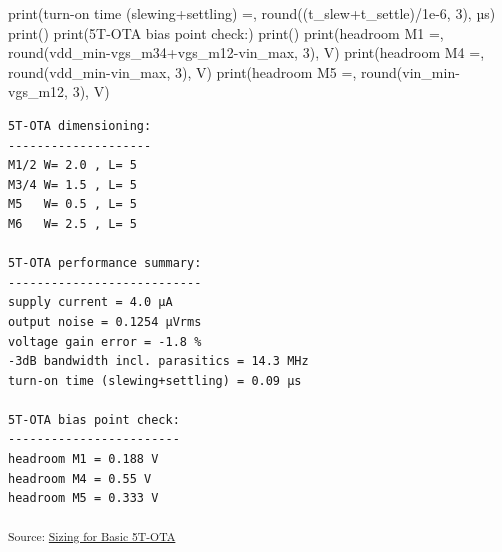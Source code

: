 \documentclass[
  a4paper,
  DIV=11,
  numbers=noendperiod]{scrartcl}
\newenvironment{Shaded}{\begin{snugshade}}{\end{snugshade}}
\newcommand{\BuiltInTok}[1]{\textcolor[rgb]{0.00,0.23,0.31}{#1}}
\newcommand{\DecValTok}[1]{\textcolor[rgb]{0.68,0.00,0.00}{#1}}
\newcommand{\FloatTok}[1]{\textcolor[rgb]{0.68,0.00,0.00}{#1}}
\newcommand{\NormalTok}[1]{\textcolor[rgb]{0.00,0.23,0.31}{#1}}
\newcommand{\OperatorTok}[1]{\textcolor[rgb]{0.37,0.37,0.37}{#1}}
\newcommand{\StringTok}[1]{\textcolor[rgb]{0.13,0.47,0.30}{#1}}
\begin{document}
\begin{tcolorbox}
\begin{Shaded}
\begin{Highlighting}[]
\BuiltInTok{print}\NormalTok{(}\StringTok{\textquotesingle{}turn{-}on time (slewing+settling) =\textquotesingle{}}\NormalTok{, }\BuiltInTok{round}\NormalTok{((t\_slew}\OperatorTok{+}\NormalTok{t\_settle)}\OperatorTok{/}\FloatTok{1e{-}6}\NormalTok{, }\DecValTok{3}\NormalTok{), }\StringTok{\textquotesingle{}µs\textquotesingle{}}\NormalTok{)}
\BuiltInTok{print}\NormalTok{()}
\BuiltInTok{print}\NormalTok{(}\StringTok{\textquotesingle{}5T{-}OTA bias point check:\textquotesingle{}}\NormalTok{)}
\BuiltInTok{print}\NormalTok{(}\StringTok{\textquotesingle{}{-}{-}{-}{-}{-}{-}{-}{-}{-}{-}{-}{-}{-}{-}{-}{-}{-}{-}{-}{-}{-}{-}{-}{-}\textquotesingle{}}\NormalTok{)}
\BuiltInTok{print}\NormalTok{(}\StringTok{\textquotesingle{}headroom M1 =\textquotesingle{}}\NormalTok{, }\BuiltInTok{round}\NormalTok{(vdd\_min}\OperatorTok{{-}}\NormalTok{vgs\_m34}\OperatorTok{+}\NormalTok{vgs\_m12}\OperatorTok{{-}}\NormalTok{vin\_max, }\DecValTok{3}\NormalTok{), }\StringTok{\textquotesingle{}V\textquotesingle{}}\NormalTok{)}
\BuiltInTok{print}\NormalTok{(}\StringTok{\textquotesingle{}headroom M4 =\textquotesingle{}}\NormalTok{, }\BuiltInTok{round}\NormalTok{(vdd\_min}\OperatorTok{{-}}\NormalTok{vin\_max, }\DecValTok{3}\NormalTok{), }\StringTok{\textquotesingle{}V\textquotesingle{}}\NormalTok{)}
\BuiltInTok{print}\NormalTok{(}\StringTok{\textquotesingle{}headroom M5 =\textquotesingle{}}\NormalTok{, }\BuiltInTok{round}\NormalTok{(vin\_min}\OperatorTok{{-}}\NormalTok{vgs\_m12, }\DecValTok{3}\NormalTok{), }\StringTok{\textquotesingle{}V\textquotesingle{}}\NormalTok{)}
\end{Highlighting}
\end{Shaded}

\begin{verbatim}
5T-OTA dimensioning:
--------------------
M1/2 W= 2.0 , L= 5
M3/4 W= 1.5 , L= 5
M5   W= 0.5 , L= 5
M6   W= 2.5 , L= 5

5T-OTA performance summary:
---------------------------
supply current = 4.0 µA
output noise = 0.1254 µVrms
voltage gain error = -1.8 %
-3dB bandwidth incl. parasitics = 14.3 MHz
turn-on time (slewing+settling) = 0.09 µs

5T-OTA bias point check:
------------------------
headroom M1 = 0.188 V
headroom M4 = 0.55 V
headroom M5 = 0.333 V
\end{verbatim}

\textsubscript{Source:
\href{https://iic-jku.github.io/analog-circuit-design/sizing/sizing_basic_ota-preview.html\#cell-0}{Sizing
for Basic 5T-OTA}}

\end{tcolorbox}
\end{document}
